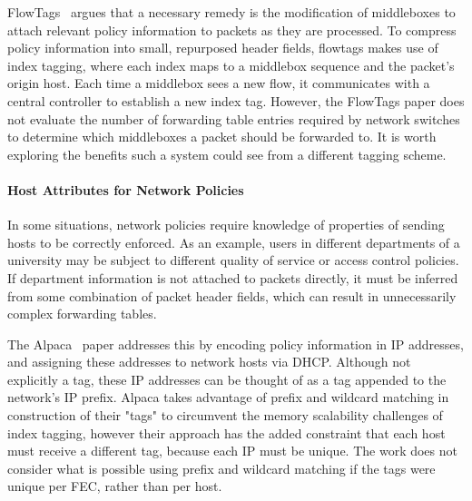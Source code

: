 FlowTags~\cite{flowtags} argues that a necessary remedy is the modification of middleboxes to attach relevant policy information to packets as they are processed. To compress policy information into small, repurposed header fields, flowtags makes use of index tagging, where each index maps to a middlebox sequence and the packet's origin host. Each time a middlebox sees a new flow, it communicates with a central controller to establish a new index tag. 
However, the FlowTags paper does not evaluate the number of forwarding table entries required by network switches to determine which middleboxes a packet should be forwarded to. It is worth exploring the benefits such a system could see from a different tagging scheme. 
 

\paragraph{Host Attributes for Network Policies}
In some situations, network policies require knowledge of properties of sending hosts to be correctly enforced. As an example, users in different departments of a university may be subject to different quality of service or access control policies. If department information is not attached to packets directly, it must be inferred from some combination of packet header fields, which can result in unnecessarily complex forwarding tables. 

The Alpaca~\cite{alpaca} paper addresses this by encoding policy information in IP addresses, and assigning these addresses to network hosts via DHCP. Although not explicitly a tag, these IP addresses can be thought of as a tag appended to the network's IP prefix. Alpaca takes advantage of prefix and wildcard matching in construction of their "tags" to circumvent the memory scalability challenges of index tagging, however their approach has the added constraint that each host must receive a different tag, because each IP must be unique. The work does not consider what is possible using prefix and wildcard matching if the tags were unique per FEC, rather than per host.


